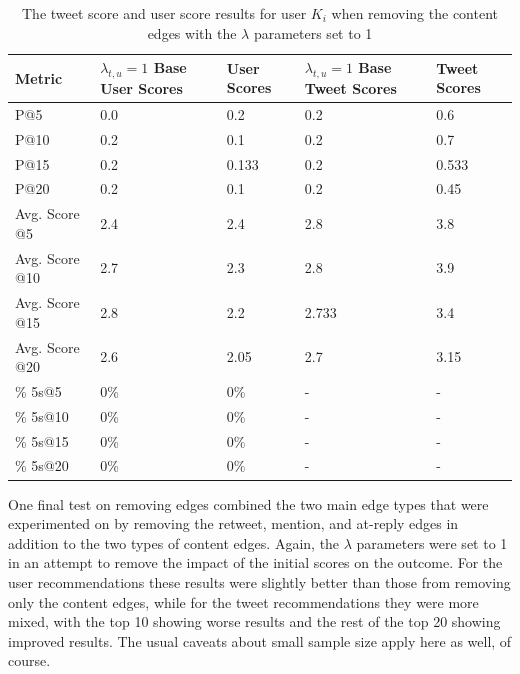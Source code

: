 \begin{table}
\centering
\begin{tabular}{l|p{2cm}|p{2cm}|p{2cm}|p{2cm}}
{\bf Metric} & {\bf $\lambda_{t,u}=1$ Base User Scores} & {\bf User Scores} & {\bf $\lambda_{t,u}=1$ Base Tweet Scores} & {\bf Tweet Scores} \\ \hline
P@5   & 0.0 & 0.2 & 0.2 & 0.6 \\ \hline
P@10 & 0.2 & 0.1 & 0.2 & 0.7 \\ \hline
P@15 & 0.2 & 0.133 & 0.2 & 0.533 \\ \hline
P@20 & 0.2 & 0.1 & 0.2 & 0.45 \\ \hline

Avg. Score @5   & 2.4 & 2.4 & 2.8 & 3.8 \\ \hline
Avg. Score @10 & 2.7 & 2.3 & 2.8 & 3.9 \\ \hline
Avg. Score @15 & 2.8 & 2.2 & 2.733 & 3.4 \\ \hline
Avg. Score @20 & 2.6 & 2.05 & 2.7 & 3.15 \\ \hline

\% 5s@5    & 0\% & 0\% & - & - \\ \hline
\% 5s@10  & 0\% & 0\% & - & - \\ \hline
\% 5s@15  & 0\% & 0\% & - & - \\ \hline
\% 5s@20  & 0\% & 0\% & - & - \\

\end{tabular}
\caption{The tweet score and user score results for user $K_{i}$ when removing the content edges with the $\lambda$ parameters set to 1}
\label{tab:RemoveContentLambdasAt1}
\end{table}

One final test on removing edges combined the two main edge types that were experimented on by removing the retweet, mention, and at-reply edges in addition to the two types of content edges. Again, the $\lambda$ parameters were set to 1 in an attempt to remove the impact of the initial scores on the outcome. For the user recommendations these results were slightly better than those from removing only the content edges, while for the tweet recommendations they were more mixed, with the top 10 showing worse results and the rest of the top 20 showing improved results. The usual caveats about small sample size apply here as well, of course.

